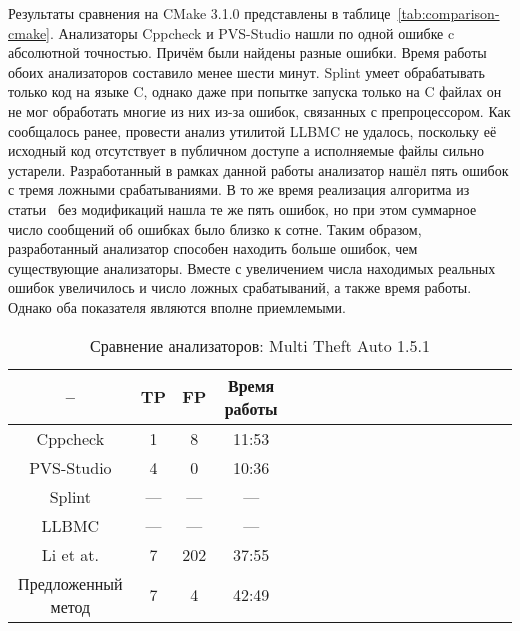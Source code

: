 Результаты сравнения на CMake 3.1.0 представлены в
таблице~\ref{tab:comparison-cmake}. Анализаторы Cppcheck и PVS-Studio
нашли по одной ошибке c абсолютной точностью. Причём были найдены
разные ошибки. Время работы обоих анализаторов составило менее шести
минут. Splint умеет обрабатывать только код на языке C, однако даже
при попытке запуска только на C файлах он не мог обработать многие из
них из-за ошибок, связанных с препроцессором. Как сообщалось ранее,
провести анализ утилитой LLBMC не удалось, поскольку её исходный код
отсутствует в публичном доступе а исполняемые файлы сильно
устарели. Разработанный в рамках данной работы анализатор нашёл пять
ошибок с тремя ложными срабатываниями. В то же время реализация
алгоритма из статьи~\cite{li2010practical} без модификаций нашла те же
пять ошибок, но при этом суммарное число сообщений об ошибках было
близко к сотне. Таким образом, разработанный анализатор способен
находить больше ошибок, чем существующие анализаторы. Вместе с
увеличением числа находимых реальных ошибок увеличилось и число ложных
срабатываний, а также время работы. Однако оба показателя являются
вполне приемлемыми.

\begin{table}[!h]
\caption{Сравнение анализаторов: Multi Theft Auto 1.5.1}\label{tab:comparison-mta}
\centering
  \begin{tabular}{|*{18}{c|}}\hline
  --                 & TP  & FP  & Время работы \\\hline
  Cppcheck           & 1   & 8   & 11:53        \\\hline
  PVS-Studio         & 4   & 0   & 10:36        \\\hline
  Splint             & --- & --- & ---          \\\hline
  LLBMC              & --- & --- & ---          \\\hline
  Li et at.          & 7   & 202 & 37:55        \\\hline
  Предложенный метод & 7   & 4   & 42:49        \\\hline
  \end{tabular}
\end{table}

